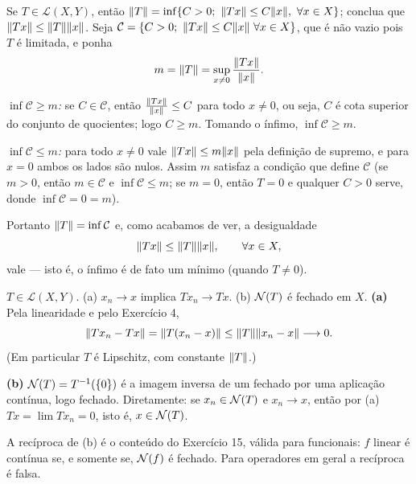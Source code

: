 \begin{exercicio}{Se $T\in\mathcal{L}(X,Y)$, então $\lVert T\rVert=\inf\{C>0;\ \lVert Tx\rVert\le C\lVert x\rVert,\ \forall x\in X\}$; conclua que $\lVert Tx\rVert\le\lVert T\rVert\lVert x\rVert$.}
\sol
Seja $\mathcal{C}=\{C>0;\ \lVert Tx\rVert\le C\lVert x\rVert\ \forall x\in X\}$, que é não vazio pois $T$ é limitada, e ponha
\[ m=\lVert T\rVert=\sup_{x\neq0}\frac{\lVert Tx\rVert}{\lVert x\rVert}. \]

\emph{$\inf\mathcal{C}\ge m$:} se $C\in\mathcal{C}$, então $\frac{\lVert Tx\rVert}{\lVert x\rVert}\le C$ para todo $x\neq0$, ou seja, $C$ é cota superior do conjunto de quocientes; logo $C\ge m$. Tomando o ínfimo, $\inf\mathcal{C}\ge m$.

\emph{$\inf\mathcal{C}\le m$:} para todo $x\neq0$ vale $\lVert Tx\rVert\le m\lVert x\rVert$ pela definição de supremo, e para $x=0$ ambos os lados são nulos. Assim $m$ satisfaz a condição que define $\mathcal{C}$ (se $m>0$, então $m\in\mathcal{C}$ e $\inf\mathcal{C}\le m$; se $m=0$, então $T=0$ e qualquer $C>0$ serve, donde $\inf\mathcal{C}=0=m$).

Portanto $\lVert T\rVert=\inf\mathcal{C}$ e, como acabamos de ver, a desigualdade
\[ \lVert Tx\rVert\le\lVert T\rVert\lVert x\rVert,\qquad \forall x\in X, \]
vale --- isto é, o ínfimo é de fato um mínimo (quando $T\neq0$).
\end{exercicio}

\begin{exercicio}{$T\in\mathcal{L}(X,Y)$. (a) $x_n\to x$ implica $Tx_n\to Tx$. (b) $\mathcal{N}(T)$ é fechado em $X$.}
\sol
\textbf{(a)} Pela linearidade e pelo Exercício 4,
\[ \lVert Tx_n-Tx\rVert=\lVert T(x_n-x)\rVert\le\lVert T\rVert\lVert x_n-x\rVert\longrightarrow0. \]
(Em particular $T$ é Lipschitz, com constante $\lVert T\rVert$.)

\textbf{(b)} $\mathcal{N}(T)=T^{-1}(\{0\})$ é a imagem inversa de um fechado por uma aplicação contínua, logo fechado. Diretamente: se $x_n\in\mathcal{N}(T)$ e $x_n\to x$, então por (a) $Tx=\lim Tx_n=0$, isto é, $x\in\mathcal{N}(T)$.

\begin{obs}
A recíproca de (b) é o conteúdo do Exercício 15, válida para funcionais: $f$ linear é contínua se, e somente se, $\mathcal{N}(f)$ é fechado. Para operadores em geral a recíproca é falsa.
\end{obs}
\end{exercicio}


